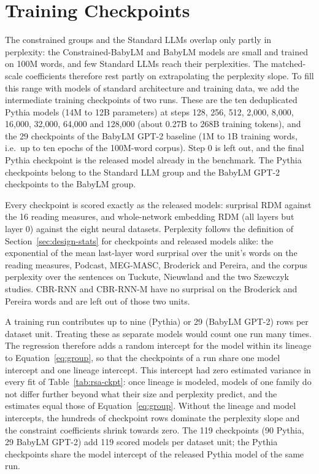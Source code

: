 \section{Training Checkpoints}
\label{app:checkpoints}

The constrained groups and the Standard LLMs overlap only partly in perplexity: the Constrained-BabyLM and BabyLM models are small and trained on 100M words, and few Standard LLMs reach their perplexities. The matched-scale coefficients therefore rest partly on extrapolating the perplexity slope. To fill this range with models of standard architecture and training data, we add the intermediate training checkpoints of two runs. These are the ten deduplicated Pythia models (14M to 12B parameters) at steps 128, 256, 512, 2{,}000, 8{,}000, 16{,}000, 32{,}000, 64{,}000 and 128{,}000 (about 0.27B to 268B training tokens), and the 29 checkpoints of the BabyLM GPT-2 baseline (1M to 1B training words, i.e.\ up to ten epochs of the 100M-word corpus). Step 0 is left out, and the final Pythia checkpoint is the released model already in the benchmark. The Pythia checkpoints belong to the Standard LLM group and the BabyLM GPT-2 checkpoints to the BabyLM group.

Every checkpoint is scored exactly as the released models: surprisal RDM against the 16 reading measures, and whole-network embedding RDM (all layers but layer 0) against the eight neural datasets. Perplexity follows the definition of Section~\ref{sec:design-stats} for checkpoints and released models alike: the exponential of the mean last-layer word surprisal over the unit's words on the reading measures, Podcast, MEG-MASC, Broderick and Pereira, and the corpus perplexity over the sentences on Tuckute, Nieuwland and the two Szewczyk studies. CBR-RNN and CBR-RNN-M have no surprisal on the Broderick and Pereira words and are left out of those two units.

A training run contributes up to nine (Pythia) or 29 (BabyLM GPT-2) rows per dataset unit. Treating these as separate models would count one run many times. The regression therefore adds a random intercept for the model within its lineage to Equation~\ref{eq:group}, so that the checkpoints of a run share one model intercept and one lineage intercept. This intercept had zero estimated variance in every fit of Table~\ref{tab:rsa-ckpt}: once lineage is modeled, models of one family do not differ further beyond what their size and perplexity predict, and the estimates equal those of Equation~\ref{eq:group}. Without the lineage and model intercepts, the hundreds of checkpoint rows dominate the perplexity slope and the constraint coefficients shrink towards zero. The 119 checkpoints (90 Pythia, 29 BabyLM GPT-2) add 119 scored models per dataset unit; the Pythia checkpoints share the model intercept of the released Pythia model of the same run.

